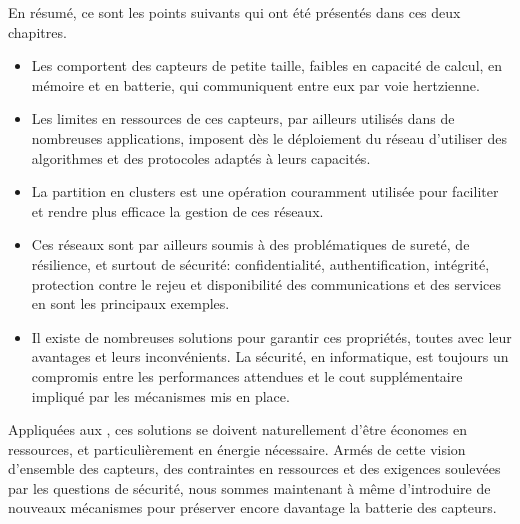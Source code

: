 En résumé, ce sont les points suivants qui ont été présentés dans ces deux chapitres.
\begin{itemize}
    \item Les \rcsfs comportent des capteurs de petite taille, faibles en capacité de calcul, en mémoire et en batterie, qui communiquent entre eux par voie hertzienne.
    \item Les limites en ressources de ces capteurs, par ailleurs utilisés dans de nombreuses applications, imposent dès le déploiement du réseau d'utiliser des algorithmes et des protocoles adaptés à leurs capacités.
    \item La partition en clusters est une opération couramment utilisée pour faciliter et rendre plus efficace la gestion de ces réseaux.
    \item Ces réseaux sont par ailleurs soumis à des problématiques de sureté, de résilience, et surtout de sécurité: confidentialité, authentification, intégrité, protection contre le rejeu et disponibilité des communications et des services en sont les principaux exemples.
    \item Il existe de nombreuses solutions pour garantir ces propriétés, toutes avec leur avantages et leurs inconvénients. La sécurité, en informatique, est toujours un compromis entre les performances attendues et le cout supplémentaire impliqué par les mécanismes mis en place.
\end{itemize}
Appliquées aux \rcs, ces solutions se doivent naturellement d'être économes en ressources, et particulièrement en énergie nécessaire.
Armés de cette vision d'ensemble des capteurs, des contraintes en ressources et des exigences soulevées par les questions de sécurité, nous sommes maintenant à même d'introduire de nouveaux mécanismes pour préserver encore davantage la batterie des capteurs.
